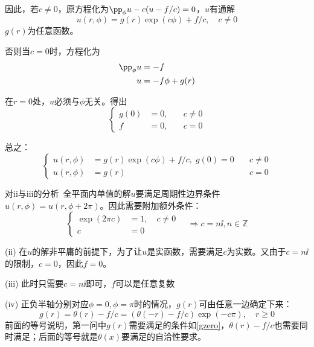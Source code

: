 \documentclass[a4paper,12pt]{ctexart}
\newcommand{\emp}[1]{{\heiti #1}}
\begin{document}
因此，若$c\neq 0$，原方程化为$\pp_\phi u-c(u-f/c)=0$，$u$有通解%
\begin{equation}
u(r,\phi)=g(r)\exp(c\phi)+f/c,\quad c\neq 0
\end{equation}
$g(r)$为任意函数。

否则当$c=0$时，方程化为
\begin{align}
 \pp_\phi u&=-f\newline\\
 u&=-f\phi+g(r)
\end{align}

在$r=0$处，$u$必须与$\phi$无关。得出
\begin{equation}
\left\{
\begin{aligned}
  g(0)&=0, \quad &c\neq 0\\
  f&=0, \quad &c=0
\end{aligned}\right.
\label{gzero}
\end{equation}

总之：
\begin{equation}\boxed{
\left\{
\begin{aligned}
 u(r,\phi)&=g(r)\exp(c\phi)+f/c,\; g(0)=0\quad &c\neq 0\\
 u(r,\phi)&=g(r)\quad &c=0
\end{aligned}\right.}
\end{equation}

\emp{对ii与iii的分析}~全平面内单值的解$u$要满足周期性边界条件$u(r,\phi)=u(r,\phi+2\pi)$。因此需要附加额外条件：
\begin{equation}
\left\{
\begin{aligned}
 \exp(2\pi c)&=1,\quad c\neq 0\\
 c&=0
\end{aligned}
\right.\quad\Rightarrow c=n\ii, n\in \mathbb{Z}
\end{equation}

(ii) 在$u$的解非平庸的前提下，为了让$u$是实函数，需要满足$c$为实数。又由于$c=n\ii$的限制，$c=0$，因此$f=0$。

(iii) 此时只需要$c=n\ii$即可，$f$可以是任意复数

(iv) 正负半轴分别对应$\phi=0, \phi=\pi$时的情况，$g(r)$可由任意一边确定下来：
\begin{equation}
g(r)=\theta(r)-f/c=(\theta(-r)-f/c)\exp(-c\pi),\quad r\geq 0
\end{equation}
前面的等号说明，第一问中$g(r)$需要满足的条件如\ref{gzero}，$\theta(r)-f/c$也需要同时满足；后面的等号就是$\theta(x)$要满足的自洽性要求。
\end{document}
